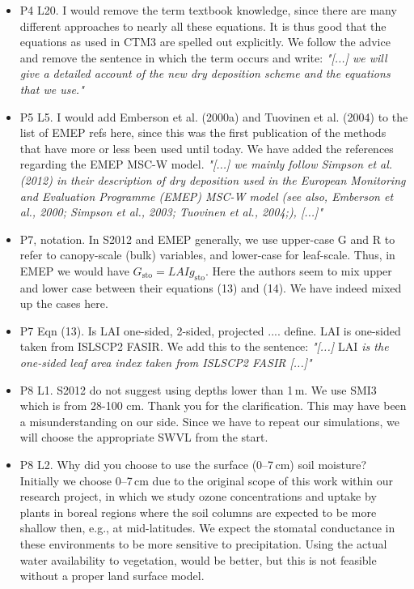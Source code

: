 \documentclass{scrartcl}
\begin{document}
\begin{itemize}
\item {\color{blue}P4 L20. I would remove the term textbook knowledge, since there are many
different approaches to nearly all these equations. It is thus good that the equations
as used in CTM3 are spelled out explicitly.}
  We follow the advice and remove the sentence in which the term occurs and write: \emph{"[...] we will give a detailed account of the new dry deposition scheme and the equations that we use."}
  
\item {\color{blue}P5 L5. I would add Emberson et al. (2000a) and Tuovinen et al. (2004) to
the list of EMEP refs here, since this was the first publication of the methods that
have more or less been used until today.}
  We have added the references regarding the EMEP MSC-W model. \emph{"[...] we mainly follow Simpson et al. (2012) in their description of dry deposition used in the European Monitoring and Evaluation Programme (EMEP) MSC-W model (see also, Emberson et al., 2000; Simpson et al., 2003; Tuovinen et al., 2004;), [...]"}
  
\item {\color{blue}P7, notation. In S2012 and EMEP generally, we use upper-case G and R to refer
to canopy-scale (bulk) variables, and lower-case for leaf-scale. Thus, in EMEP
we would have $G_\mathrm{sto} = LAI g_\mathrm{sto}$. Here the authors seem to mix upper and lower
case between their equations (13) and (14).}
  We have indeed mixed up the cases here.
  
\item {\color{blue}P7 Eqn (13). Is LAI one-sided, 2-sided, projected .... define.}
  LAI is one-sided taken from ISLSCP2 FASIR. We add this to the sentence: \emph{"[...] $\text{LAI}$ is the one-sided leaf area index taken from ISLSCP2 FASIR [...]"}
  
\item {\color{blue}P8 L1. S2012 do not suggest using depths lower than 1\,m. We use SMI3 which
  is from 28-100 cm.}
Thank you for the clarification. This may have been a misunderstanding on our side. Since we have to repeat our simulations, we will choose the appropriate SWVL from the start.
  
\item {\color{blue}P8 L2. Why did you choose to use the surface (0--7\,cm) soil moisture?}
  Initially we choose 0--7\,cm due to the original scope of this work within our research project, in which we study ozone concentrations and uptake by plants in boreal regions where the soil columns are expected to be more shallow then, e.g., at mid-latitudes. We expect the stomatal conductance in these environments to be more sensitive to precipitation. Using the actual water availability to vegetation, would be better, but this is not feasible without a proper land surface model. 
  

\end{itemize}
\end{document}
